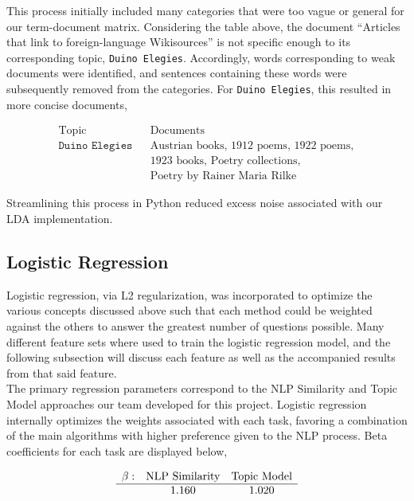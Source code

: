 \documentclass{article}
\theoremstyle{mystuff}
\theoremstyle{myexample}
\theoremstyle{named}
\begin{document}
This process initially included many categories that were too vague or general for our term-document matrix. Considering the table above, the document ``Articles that link to foreign-language Wikisources'' is not specific enough to its corresponding topic, \texttt{Duino Elegies}. Accordingly, words corresponding to weak documents were identified, and sentences containing these words were subsequently removed from the categories. For \texttt{Duino Elegies}, this resulted in more concise documents,

\[
	\begin{array}{lll}
		\text{Topic} & & \text{Documents} \\ \hline
		\texttt{Duino Elegies} & & \text{Austrian books}, \, \text{1912 poems}, \, \text{1922 poems}, \\
		& & \text{1923 books}, \, \text{Poetry collections}, \\
		& & \text{Poetry by Rainer Maria Rilke}
	\end{array}
\]

\noindent Streamlining this process in Python reduced excess noise associated with our LDA implementation.


\subsection{Logistic Regression}
Logistic regression, via L2 regularization, was incorporated to optimize the various concepts discussed above such that each method could be weighted against the others to answer the greatest number of questions possible.  Many different feature sets where used to train the logistic regression model, and the following subsection will discuss each feature as well as the accompanied results from that said feature. \\

The primary regression parameters correspond to the NLP Similarity and Topic Model approaches our team developed for this project. Logistic regression internally optimizes the weights associated with each task, favoring a combination of the main algorithms with higher preference given to the NLP process. Beta coefficients for each task are displayed below,

\[
	\begin{array}{ccc}
		\textbf{$\beta$}: & \text{NLP Similarity} & \text{Topic Model} \\\hline
			& 1.160 & 1.020
	\end{array}
\]
\end{document}
